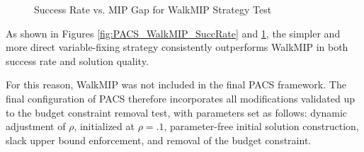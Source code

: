 \begin{figure}[H]
\centering
\begin{minipage}{0.6\columnwidth}
\centering
\resizebox{\linewidth}{!}{}
\end{minipage}%
\hfill
\begin{minipage}{0.4\columnwidth}
\centering
\resizebox{\linewidth}{!}{}
\end{minipage}
\caption{Success Rate vs. MIP Gap for WalkMIP Strategy Test}
\label{fig:PACS_WalkMIP_MGAP}
\end{figure}

As shown in Figures \ref{fig:PACS_WalkMIP_SuccRate} and \ref{fig:PACS_WalkMIP_MGAP}, the simpler and more direct variable-fixing strategy consistently outperforms WalkMIP in both success rate and solution quality.

For this reason, WalkMIP was not included in the final PACS framework. The final configuration of PACS therefore incorporates all modifications validated up to the budget constraint removal test, with parameters set as follows: dynamic adjustment of $\rho$, initialized at $\rho=.1$, parameter-free initial solution construction, slack upper bound enforcement, and removal of the budget constraint.

